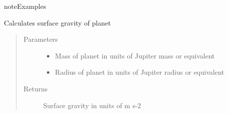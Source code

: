 \documentclass[a4paper,10pt,english]{sphinxmanual}
\begin{document}
\begin{fulllineitems}
\begin{sphinxadmonition}{note}{Examples}
%
\begin{sphinxVerbatim}[commandchars=\\\{\}]
      
    
   
\end{sphinxVerbatim}

%
\begin{sphinxVerbatim}[commandchars=\\\{\}]
 
     
    
\end{sphinxVerbatim}
\end{sphinxadmonition}

\end{fulllineitems}


\begin{fulllineitems}
\label{\detokenize{cascade.exoplanet_tools:cascade.exoplanet_tools.exoplanet_tools.SurfaceGravity}}
Calculates surface gravity of planet
\begin{quote}\begin{description}
\item[{Parameters}] \leavevmode\begin{itemize}
\item {} 
 \textendash{} Mass of planet in units of Jupiter mass or equivalent

\item {} 
 \textendash{} Radius of planet in units of Jupiter radius or equivalent

\end{itemize}

\item[{Returns}] \leavevmode
{} \textendash{} Surface gravity in units of  m s-2

\end{description}\end{quote}

\end{fulllineitems}
\end{document}

